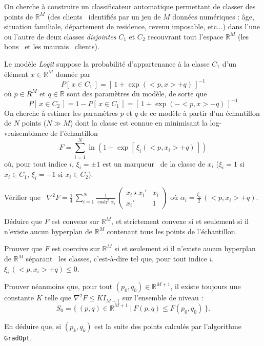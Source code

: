 \documentclass[12pt,a4paper,fleqn]{report}
\newcommand{\R}{\mathbb R}
\newcommand{\hess}{\nabla^2}
\begin{document}
 \begin{exercice}[(scoring)]
 On cherche \`a construire un classificateur automatique permettant de classer des points de $\R^M$ (des \og clients \fg\ identifi\'es par un jeu de $M$ donn\'ees num\'eriques : âge, situation familiale, d\'epartement de residence, revenu imposable, etc...) dans l'une ou l'autre de deux classes \textit{disjointes} $C_1$ et $C_2$ recouvrant tout l'espace $\R^M$ (les \og bons \fg\ et les \og mauvais \fg\ clients). 
 
 Le mod\`ele \textit{Logit} suppose la probabilit\'e d'appartenance \`a la classe $C_1$ d'un \'el\'ement \mbox{$x\in \R^M$} donn\'ee par
\[
P[\,x\in C_1\,]=\left[\,1+\exp (<p,x> +q)\,\right]^{-1}
\]
o\`u \mbox{$p\in R^M$} et \mbox{$q\in \R$} sont des param\`etres du mod\`ele, de sorte que
\[
P[\,x\in C_2\,] =1- P[\,x\in C_1\,] = \left[\,1+\exp (-<p,x> -q)\,\right]^{-1}
\]
On cherche \`a estimer les param\`etres $p$ et $q$ de ce mod\`ele \`a partir d'un \'echantillon de $N$ points ($N\gg M$) dont la classe est connue en minimisant la log-vraisemblance de l'\'echantillon
\[
 F=\sum_{i=1}^N \ln (1+\exp [\,\xi_i(<p,x_i>+q)\,]) 
\]
o\`u, pour tout indice $i$, $\xi_i=\pm 1$ est un \og marqueur \fg\ de la classe de $x_i$ ($\xi_i=1$ si $x_i\in C_1$, $\xi_i=-1$ si $x_i\in C_2$).
\begin{questions}
\item V\'erifier que
\mbox{ $ \displaystyle
\hess F=\frac{1}{4}\,\sum_{i=1}^N \frac{1}{\cosh^2 \alpha_i}\,\left(\begin{array}{cc} x_i\star x_i' & x_i \\ x_i' & 1 \end{array}\right)
$}
o\`u $\alpha_i=\frac{\xi_i}{2}\,(<p, x_i>+q)$.
\item D\'eduire que $F$ est convexe sur $\R^M$, et strictement convexe si et seulement si il n'existe aucun hyperplan de $\R^M$ contenant tous les points de l'\'echantillon.
\item Prouver que $F$ est coercive sur $\R^M$ si et seulement si il n'existe aucun hyperplan de $\R^M$ \og s\'eparant \fg\ les classes, c'est-\`a-dire tel que, pour tout indice $i$, $\xi_i\,(<p,x_i>+q)\leq 0$.
\item Prouver n\'eanmoins que, pour tout $(p_0,q_0)\in \R^{M+1}$, il existe toujours une constante $K$ telle que $\hess F\leq K I_{M+1}$ sur l'ensemble de niveau :
\[
S_0=\{ \ (p,q)\in \R^{M+1} \ | \ F(p,q)\leq F(p_0,q_0) \ \}.
\]
\item En d\'eduire que, si $(p_k,q_k)$ est la suite des points calcul\'es par l'algorithme \texttt{GradOpt}, 

\end{questions}
\end{exercice}
\end{document}
